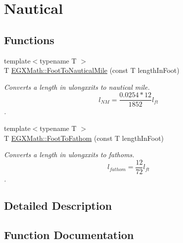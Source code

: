 \hypertarget{group___e_g_x_math-_conversions-_length_conversions-_imperial-_foot-_nautical}{}\section{Nautical}
\label{group___e_g_x_math-_conversions-_length_conversions-_imperial-_foot-_nautical}
\subsection*{Functions}
\begin{DoxyCompactItemize}
\item 
{\footnotesize template$<$typename T $>$ }\\T \mbox{\hyperlink{group___e_g_x_math-_conversions-_length_conversions-_imperial-_foot-_nautical_ga2b73f417fb0e4bcb50bdf79594088a75}{E\+G\+X\+Math\+::\+Foot\+To\+Nautical\+Mile}} (const T length\+In\+Foot)
\begin{DoxyCompactList}\small\item\em Converts a length in ulongxxits to nautical mile. \[ l_{NM}= \frac{0.0254 * 12}{1852} l_{ft} \]. \end{DoxyCompactList}\item 
{\footnotesize template$<$typename T $>$ }\\T \mbox{\hyperlink{group___e_g_x_math-_conversions-_length_conversions-_imperial-_foot-_nautical_gaf0a9ed2bf09d2f5f4099c96c702853d0}{E\+G\+X\+Math\+::\+Foot\+To\+Fathom}} (const T length\+In\+Foot)
\begin{DoxyCompactList}\small\item\em Converts a length in ulongxxits to fathoms. \[ l_{fathom}= \frac{12}{72} l_{ft} \]. \end{DoxyCompactList}\end{DoxyCompactItemize}


\subsection{Detailed Description}


\subsection{Function Documentation}
\mbox{\label{group___e_g_x_math-_conversions-_length_conversions-_imperial-_foot-_nautical_gaf0a9ed2bf09d2f5f4099c96c702853d0}} 

